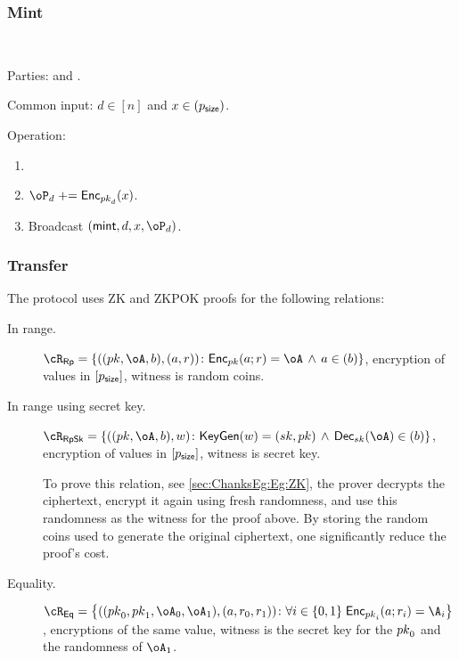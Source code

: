 \subsubsection{Mint}

\begin{protocol}~\label{prot:ConfidentialTransactions:Mint}
	\item[Parties:] \Mc and \Cc.
	
	
	
	\item[Common input:]  $d\in [n]$ and $x\in (p_{\mathsf{size}})$.
	
	\item[Operation:]  \Cc~
		\begin{enumerate}
			\item {}
			
			\item  $\oP_d \pluseq \Enc_{\pk_d}(x)$.
				
			
			\item Broadcast 	 	$(\mint,d,x,\oP_d)$.
		
	\end{enumerate}
\end{protocol}

\subsubsection{Transfer}

The protocol uses ZK and ZKPOK proofs for the   following  relations:

\begin{description}
	\item[In range.] $\rRp =\rRpDef$, \ie  encryption of values in $[p_{\mathsf{size}}]$, witness is random coins.
	
		\item[In range using secret key.] $\rRpSk =\rRpSkDef$, \ie  encryption of values in $[p_{\mathsf{size}}]$, witness is secret key. 
		\begin{remark}
			To prove this relation, see \cref{sec:ChanksEg:Eg:ZK}, the prover decrypts the ciphertext, encrypt it again using fresh randomness, and use this randomness as the witness for the proof above. By storing the random coins used to generate the original ciphertext, one significantly reduce the proof's cost.
		\end{remark}
		
	\item[Equality.] $\rEq =\rEqDef$, \ie  encryptions of the same value, witness is the  secret key for the ${pk}_0$ and the randomness of  $\oA_1$.
	

\end{description}




